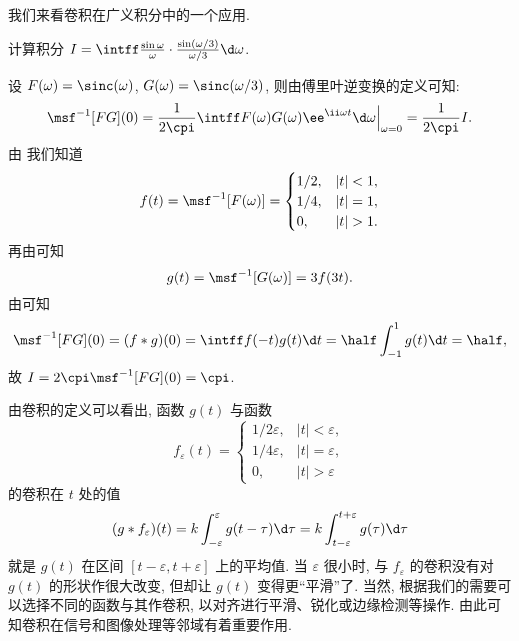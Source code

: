 我们来看卷积在广义积分中的一个应用.

\begin{example}
  计算积分 $I=\intff \frac{\sin \omega}{\omega}\cdot \frac{\sin (\omega/3)}{\omega/3}\d\omega$.
\end{example}

\begin{solution}
  设 $F(\omega)=\sinc(\omega)$, $G(\omega)=\sinc(\omega/3)$, 则由傅里叶逆变换的定义可知:
  \[
     \msf^{-1}[FG](0)
    =\frac1{2\cpi}\intff F(\omega)G(\omega)\ee^{\ii \omega t}\d\omega\Big|_{\omega=0}
    =\frac1{2\cpi}I.
  \]
  由 我们知道
  \[
    f(t)=\msf^{-1}[F(\omega)]=\begin{cases}
      1/2, & |t|<1,\\
      1/4, & |t|=1,\\
      0, & |t|>1.
    \end{cases}
  \]
  再由\thmFSim 可知
  \[
    g(t)=\msf^{-1}[G(\omega)]=3f(3t).
  \]
  由\thmFConv 可知
  \[
     \msf^{-1}[FG](0)
    =(f\ast g)(0)
    =\intff f(-t)g(t)\d t
    =\half\int_{-1}^1 g(t)\d t
    =\half,
  \]
  故 $I=2\cpi\msf^{-1}[FG](0)=\cpi$.
\end{solution}

由卷积的定义可以看出, 函数 $g(t)$ 与函数
\[
  f_\varepsilon(t)=\begin{cases}
    1/2\varepsilon, & |t|<\varepsilon,\\
    1/4\varepsilon, & |t|=\varepsilon,\\
    0, & |t|>\varepsilon
  \end{cases}
\]
的卷积在 $t$ 处的值
\[
   (g\ast f_\varepsilon)(t)
  =k\int_{-\varepsilon}^{\varepsilon} g(t-\tau)\d \tau
  =k\int_{t-\varepsilon}^{t+\varepsilon} g(\tau)\d \tau
\]
就是 $g(t)$ 在区间 $[t-\varepsilon,t+\varepsilon]$ 上的平均值.
当 $\varepsilon$ 很小时, 与 $f_\varepsilon$ 的卷积没有对 $g(t)$ 的形状作很大改变, 但却让 $g(t)$ 变得更``平滑''了.
当然, 根据我们的需要可以选择不同的函数与其作卷积, 以对齐进行平滑、锐化或边缘检测等操作.
由此可知卷积在信号和图像处理等邻域有着重要作用.

